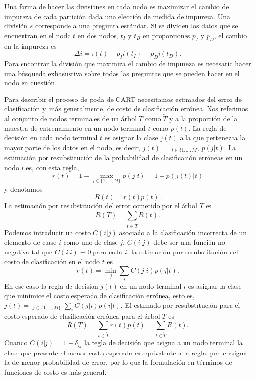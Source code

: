 \documentclass[letterpaper,12pt]{book}
\DeclareMathOperator*{\argmax}{arg\,m\acute{a}x}
\DeclareMathOperator*{\argmin}{arg\,m\acute{i}n}
\begin{document}
Una forma de hacer las divisiones en cada nodo es maximizar el cambio de impureza de cada partición dada una elección de medida de impureza. Una división $s$ corresponde a una pregunta estándar. Si se dividen los datos que se encuentran en el nodo $t$ en dos nodos,  $t_I$ y $t_D$ en proporciones $p_I$ y $p_D$, el cambio en la impureza es
\begin{equation}
\Delta i = i(t)-p_Ii(t_I)-p_Di(t_D).
\end{equation}
Para encontrar la división que maximiza el cambio de impureza es necesario hacer una búsqueda exhasustiva sobre todas las preguntas que se pueden hacer en el nodo en cuestión. 

Para describir el proceso de poda de CART necesitamos estimados del error de clasificación y, más generalmente, de costo de clasificación errónea. Nos referimos al conjunto de nodos terminales de un árbol $T$ como $\widetilde{T}$ y a la proporción de la muestra de entrenamiento en un nodo terminal $t$ como $p(t)$. La regla de decisión en cada nodo terminal $t$ es asignar la clase $j(t)$ a la que pertenezca la mayor parte de los datos en el nodo, es decir, $j(t) = \argmax_{j\in\{1,\dots,M\}}p(j|t)$. La estimación por resubstitución de la probabilidad de clasificación erróneas en un nodo $t$ es, con esta regla,
\begin{equation}
r(t)=1-\max_{j\in\{1,\dots,M\}}p(j|t) = 1-p(j(t)|t)
\end{equation}
y denotamos 
\begin{equation}
R(t) = r(t)p(t).
\end{equation}
La estimación por resubstitución del error cometido por el árbol $T$ es 
\begin{equation}
R(T) = \sum_{t\in\tilde{T}}R(t).
\end{equation} 
Podemos introducir un costo $C(i|j)$ asociado a la clasificación incorrecta de un elemento de clase $i$ como uno de clase $j$. $C(i|j)$ debe ser una función no negativa tal que $C(i|i) = 0$ para cada $i$. la  estimación por resubstitución del costo de clasificación en el nodo $t$ es 
\begin{equation}
r(t) = \min_j\sum_iC(j|i)p(j|t).
\end{equation}
En ese caso la regla de decisión $j(t)$ en un nodo terminal $t$ es asignar la clase que minimice el costo esperado de clasificación errónea, esto es, $j(t) = \argmin_{j\in\{1,\dots,M\}}\sum_iC(j|i)p(i|t)$. El estimado por resubstitución para el costo esperado de clasificación errónea para el árbol $T$ es
\begin{equation}
R(T) = \sum_{t\in\tilde{T}}r(t)p(t)=\sum_{t\in\tilde{T}}R(t).
\end{equation}
Cuando $C(i|j) = 1-\delta_{ij}$ la regla de decisión que asigna a un nodo terminal la clase que presente el menor costo esperado es equivalente a la regla que le asigna la de menor probabilidad de error, por lo que la formulación en términos de funciones de costo es más general.
\end{document}
